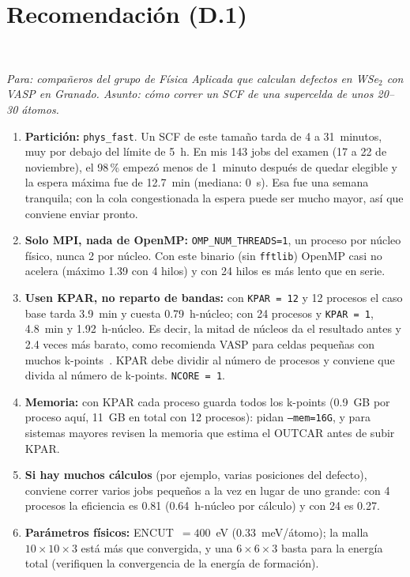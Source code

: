 \documentclass[11pt,a4paper]{article}
\newcommand{\cod}[1]{\texttt{#1}}
\begin{document}
\section{Recomendación (D.1)}

\begin{table}[H]
\centering\small
\\[8pt]

\caption{Arriba: costo de un cálculo SCF del caso base (h-núcleo $=p\,t$). Abajo: consumo del examen según
\cod{sacct} (CPUTimeRAW, \cod{phys\_fast}): los 166 jobs con JobID $\geq 528789$, desde el 17 de noviembre. El
registro del enunciado incluye además jobs anteriores que no son del examen (final de la Sec.~\ref{sec:d2}).}
\label{tab:D}
\end{table}

\noindent\textit{Para: compañeros del grupo de Física Aplicada que calculan defectos en WSe$_2$ con VASP en
Granado. Asunto: cómo correr un SCF de una supercelda de unos 20--30 átomos.}

\begin{enumerate}[leftmargin=*]
\item \textbf{Partición:} \cod{phys\_fast}. Un SCF de este tamaño tarda de 4 a 31~minutos, muy por debajo del
límite de 5~h. En mis 143 jobs del examen (17 a 22 de noviembre), el 98\,\% empezó menos de 1~minuto después de quedar
elegible y la espera máxima fue de 12.7~min (mediana: 0~s). Esa fue una semana tranquila; con la cola
congestionada la espera puede ser mucho mayor, así que conviene enviar pronto.
\item \textbf{Solo MPI, nada de OpenMP:} \cod{OMP\_NUM\_THREADS=1}, un proceso por núcleo físico, nunca 2 por
núcleo. Con este binario (sin \cod{fftlib}) OpenMP casi no acelera (máximo 1.39 con 4 hilos) y con 24 hilos es
más lento que en serie.
\item \textbf{Usen KPAR, no reparto de bandas:} con \cod{KPAR = 12} y 12 procesos el caso base tarda 3.9~min y
cuesta 0.79~h-núcleo; con 24 procesos y \cod{KPAR = 1}, 4.8~min y 1.92~h-núcleo. Es decir, la mitad de núcleos
da el resultado antes y 2.4 veces más barato, como recomienda VASP para celdas pequeñas con muchos
k-points~\cite{vasp-opt}. KPAR debe dividir al número de procesos y conviene que divida al número de k-points.
\cod{NCORE = 1}.
\item \textbf{Memoria:} con KPAR cada proceso guarda todos los k-points (0.9~GB por proceso aquí, 11~GB en
total con 12 procesos): pidan \cod{--mem=16G}, y para sistemas mayores revisen la memoria que estima el OUTCAR
antes de subir KPAR.
\item \textbf{Si hay muchos cálculos} (por ejemplo, varias posiciones del defecto), conviene correr varios jobs
pequeños a la vez en lugar de uno grande: con 4 procesos la eficiencia es 0.81 (0.64~h-núcleo por cálculo) y
con 24 es 0.27.
\item \textbf{Parámetros físicos:} ENCUT~$=400$~eV (0.33~meV/átomo); la malla $10\times10\times3$ está más que
convergida, y una $6\times6\times3$ basta para la energía total (verifiquen la convergencia de la energía de
formación).
\end{enumerate}
\end{document}
